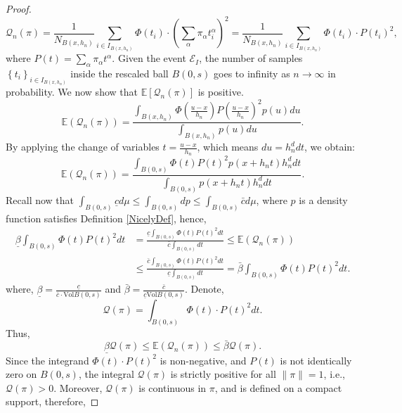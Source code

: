 \documentclass[10pt,a4paper]{amsart}
\begin{document}
\begin{proof}
$$
\mathcal{Q}_n(\pi)=\frac{1}{N_{B\left(x, h_n\right)}} \sum_{i \in I_{B\left(x, h_n\right)}} \Phi\left(t_i\right) \cdot\left(\sum_\alpha \pi_\alpha t_i^\alpha\right)^2=\frac{1}{N_{B\left(x, h_n\right)}} \sum_{i \in I_{B\left(x, h_n\right)}} \Phi\left(t_i\right) \cdot P\left(t_i\right)^2,
$$
where $P(t)=\sum_\alpha \pi_\alpha t^\alpha$.
Given the event $\mathscr{E}_I$, the number of samples $\left\{t_i\right\}_{i \in I_{B\left(x, h_n\right)}}$ inside the rescaled ball $B(0, s)$ goes to infinity  as $n \rightarrow \infty$ in probability.  We now show that 
$\mathbb{E}\left[\mathcal{Q}_n(\pi)\right]$ is positive.
$$
\mathbb{E}\left(\mathcal{Q}_n(\pi)\right)=\frac{\int_{B\left(x, h_n\right)} \Phi\left(\frac{u-x}{h_n}\right) P\left(\frac{u-x}{h_n}\right)^2 p(u) d u}{\int_{B\left(x, h_n\right)} p(u) d u}.
$$
By applying the change of variables $t=\frac{u-x}{h_n}$, which means $d u=h_n^d d t$, we obtain:
$$
\mathbb{E}(\mathcal{Q}_n(\pi))=\frac{\int_{B(0, s)} \Phi(t) P(t)^2 p\left(x+h_n t\right) h_n^d d t}{\int_{B(0, s)} p\left(x+h_n t\right) h_n^d d t}.
$$
Recall now that $\int_{B(0,s)} \underline{c} d \mu \leq \int_{B(0,s)} d p \leq\int_{B(0,s)} \bar{c} d \mu$, where $p$ is a density function satisfies Definition \ref{NicelyDef}, hence,
\begin{equation}
\begin{aligned}
    \underline{\beta} \int_{B(0, s)} \Phi(t) P(t)^2 dt 
    &= \frac{\underline{c}\int_{B(0, s)} \Phi(t) P(t)^2 d t}{\bar{c}\int_{B(0, s)} d t} 
    \leq \mathbb{E}(\mathcal{Q}_n(\pi)) \\
    &\leq \frac{\bar{c}\int_{B(0, s)} \Phi(t) P(t)^2 d t}{\underline{c}\int_{B(0, s)} d t} 
    = \bar{\beta} \int_{B(0, s)} \Phi(t) P(t)^2 dt.
\end{aligned}
\end{equation}
where, $\underline{\beta}= \frac{\underline{c}}{\bar{c}\cdot \text{Vol}B(0,s)} $ and $\bar{\beta}=\frac{\bar{c}}{\underline{c}\text{Vol}B(0,s)} $. Denote,
$$
\mathcal{Q}(\pi)=\int_{B(0, s)} \Phi(t) \cdot P(t)^2 dt.
$$
Thus,
\begin{equation}
    \underline{\beta} \mathcal{Q}(\pi) \leq \mathbb{E}(\mathcal{Q}_n(\pi))\leq
\bar{\beta} \mathcal{Q}(\pi).
\label{bound of EQ_n}
\end{equation}
Since the integrand $\Phi(t) \cdot P(t)^2 $ is non-negative, and $P(t) $ is not identically zero on $ B(0,s)$, the integral $\mathcal{Q}(\pi) $ is strictly positive for all $\|\pi\|=1 $, i.e., $\mathcal{Q}(\pi)>0$.
Moreover, $\mathcal{Q}(\pi)$ is continuous in $\pi$, and is defined on a compact support, therefore,

\end{proof}
\end{document}
